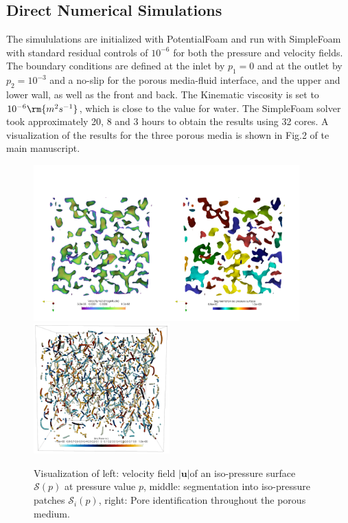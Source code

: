 \documentclass[draft,jgrga]{agutexSI2019}
\begin{document}
\begin{article}
\subsection{Direct Numerical Simulations}
The simululations are initialized with PotentialFoam and run with SimpleFoam with standard residual controls of $10^{-6}$ for both the pressure and velocity fields. The boundary conditions are defined at the inlet by $p_1 = 0$ and at the outlet by $p_2 = 10^{-3}$ and a no-slip for the porous media-fluid interface, and the upper and lower wall, as well as the front and back. The Kinematic viscosity is set to $10^{-6}\rm{m^2s^{-1}}$, which is close to the value for water. The SimpleFoam solver took approximately 20, 8 and 3 hours to obtain the results using 32 cores. A visualization of the results for the three porous media is shown in Fig.2 of te main manuscript.

\begin{figure}[htbp!]
\includegraphics[height=6cm]{figures/semgentation_veloctiy_iso_p_surface.png}
\includegraphics[height=5cm]{figures/pores_PM2.png}
\caption{Visualization of left: velocity field $|\mathbf{u}|$of an iso-pressure surface $\mathcal{S}(p)$ at pressure value $p$, middle: segmentation into iso-pressure patches  $\mathcal{S}_i(p)$, right: Pore identification throughout the porous medium. }\label{fig:segmentation}
\end{figure}




\end{article}
\end{document}
